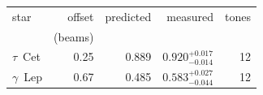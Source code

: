 \begin{tabular}{@{}l@{~~}r@{~~}r@{~~}r@{~~}r@{}}
\hline
star & offset & predicted & measured & tones \\
 & (beams) & & & \\
\hline
$\tau$~Cet & 0.25 & 0.889 & $0.920^{+0.017}_{-0.014}$ & 12 \\
$\gamma$~Lep & 0.67 & 0.485 & $0.583^{+0.027}_{-0.044}$ & 12 \\
\hline
\end{tabular}
